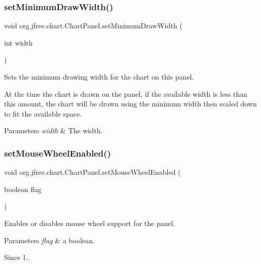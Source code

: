 \subsubsection{\texorpdfstring{set\+Minimum\+Draw\+Width()}{setMinimumDrawWidth()}}
{\footnotesize\ttfamily void org.\+jfree.\+chart.\+Chart\+Panel.\+set\+Minimum\+Draw\+Width (\begin{DoxyParamCaption}\item[{int}]{width }\end{DoxyParamCaption})}

Sets the minimum drawing width for the chart on this panel. 

At the time the chart is drawn on the panel, if the available width is less than this amount, the chart will be drawn using the minimum width then scaled down to fit the available space.


\begin{DoxyParams}{Parameters}
{\em width} & The width. \\
\hline
\end{DoxyParams}
\mbox{\label{classorg_1_1jfree_1_1chart_1_1_chart_panel_a93dfdfc1e78f4e2153828ea0c7730d4f}} 
\subsubsection{\texorpdfstring{set\+Mouse\+Wheel\+Enabled()}{setMouseWheelEnabled()}}
{\footnotesize\ttfamily void org.\+jfree.\+chart.\+Chart\+Panel.\+set\+Mouse\+Wheel\+Enabled (\begin{DoxyParamCaption}\item[{boolean}]{flag }\end{DoxyParamCaption})}

Enables or disables mouse wheel support for the panel.


\begin{DoxyParams}{Parameters}
{\em flag} & a boolean.\\
\hline
\end{DoxyParams}
\begin{DoxySince}{Since}
1.. 
\end{DoxySince}
\mbox{\label{classorg_1_1jfree_1_1chart_1_1_chart_panel_ab72694f71a53fe8fdd3ed79cd1a990f7}} 
